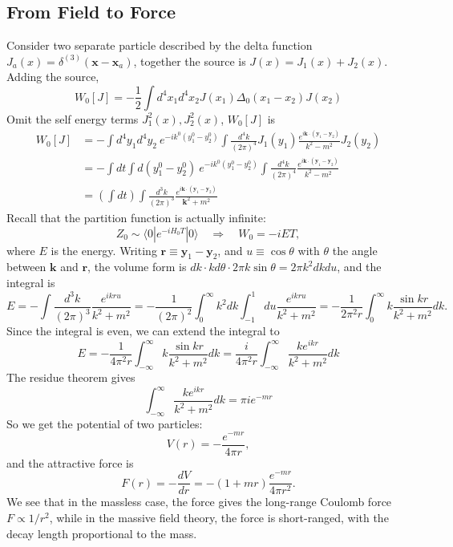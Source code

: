 \documentclass[aps,prb,superscriptaddress,nofootinbib]{revtex4}
\begin{document}
\subsection{From Field to Force}
Consider two separate particle described by the delta function $J_a(x) = \delta^{(3)}(\bm x - \bm x_a)$, together the source is $J(x) = J_1(x) + J_2(x)$.
Adding the source,
\begin{equation*}
	W_0[J] = -\frac{1}{2}\int d^4x_1 d^4 x_2 J(x_1) \Delta_0(x_1-x_2) J(x_2)
\end{equation*}
Omit the self energy terms $J_1^2(x), J_2^2(x)$, $W_0[J]$ is
\begin{equation}
\begin{aligned}
	W_0[J] &= -\int d^4 y_1 d^4 y_2\ e^{-ik^0(y_1^0-y_2^0)}\int \frac{d^4 k}{(2\pi)^4} J_1(y_1)\frac{e^{i\bm k\cdot (\bm y_1-\bm y_2)}}{k^2-m^2} J_2(y_2) \\
	&= -\int  dt \int d (y_1^0 - y_2^0) \ e^{-ik^0(y_1^0-y_2^0)}\int \frac{d^4 k}{(2\pi)^4} \frac{e^{i\bm k\cdot (\bm y_1-\bm y_2)}}{k^2-m^2} \\
	&= \left(\int dt \right)\int \frac{d^3 k}{(2\pi)^3} \frac{e^{i\bm k\cdot (\bm y_1-\bm y_2)}}{\bm k^2 + m^2}
\end{aligned}
\end{equation}
Recall that the partition function is actually infinite:
\begin{equation}
	Z_0 \sim \langle 0| e^{-i H_0 T} |0\rangle \quad \Longrightarrow \quad
	W_0 = -i E T,
\end{equation}
where $E$ is the energy.
Writing $\bm r \equiv \bm y_1 - \bm y_2$, and $u \equiv \cos\theta$ with $\theta$ the angle between $\bm k$ and $\bm r$, the volume form is $dk \cdot kd\theta \cdot  2\pi k \sin \theta = 2\pi k^2 dk du$, and the integral is
\begin{equation}
	E = -\int \frac{d^3 k}{(2\pi)^3} \frac{e^{i k r u}}{k^2 + m^2} 
	= - \frac{1}{(2\pi)^2} \int_0^\infty k^2 dk \int_{-1}^1 du \frac{e^{ikru}}{k^2 +m^2} 
	= -\frac{1}{2\pi^2 r} \int_0^\infty k  \frac{\sin kr}{k^2 +m^2} dk.
\end{equation}
Since the integral is even, we can extend the integral to
\begin{equation}
	E = -\frac{1}{4\pi^2 r} \int_{-\infty}^\infty k  \frac{\sin kr}{k^2 +m^2} dk 
	= \frac{i}{4\pi^2 r} \int_{-\infty}^\infty \frac{k e^{ikr}}{k^2 +m^2} dk
\end{equation}
The residue theorem gives
\begin{equation}
	\int_{-\infty}^\infty \frac{k e^{ikr}}{k^2 +m^2} dk = \pi ie^{-mr}
\end{equation}
So we get the potential of two particles:
\begin{equation}\label{eq:field-to-force}
	V(r) = -\frac{e^{-mr}}{4\pi r},
\end{equation}
and the attractive force is
\begin{equation}
	F(r) = -\frac{dV}{dr} = -(1+mr)\frac{e^{-mr}}{4\pi r^2}.
\end{equation}
We see that in the massless case, the force gives the long-range Coulomb force $F \propto 1/r^2$, while in the massive field theory, the force is short-ranged, with the decay length proportional to the mass.
\end{document}
